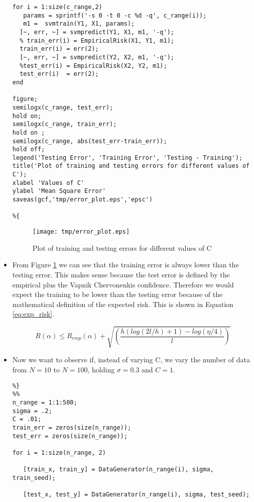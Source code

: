 \documentclass[11pt, twoside]{article}   	%
\begin{document}
\begin{itemize}
\begin{lstlisting}
for i = 1:size(c_range,2)
   params = sprintf('-s 0 -t 0 -c %d -q', c_range(i)); 
   m1 =  svmtrain(Y1, X1, params);
  [~, err, ~] = svmpredict(Y1, X1, m1, '-q'); 
  % train_err(i) = EmpiricalRisk(X1, Y1, m1); 
  train_err(i) = err(2); 
  [~, err, ~] = svmpredict(Y2, X2, m1, '-q');
  %test_err(i) = EmpiricalRisk(X2, Y2, m1); 
  test_err(i)  = err(2); 
end

figure; 
semilogx(c_range, test_err);
hold on; 
semilogx(c_range, train_err); 
hold on ;
semilogx(c_range, abs(test_err-train_err)); 
hold off; 
legend('Testing Error', 'Training Error', 'Testing - Training'); 
title('Plot of training and testing errors for different values of C'); 
xlabel 'Values of C'
ylabel 'Mean Square Error'
saveas(gcf,'tmp/error_plot.eps','epsc')

%{
\end{lstlisting}

\begin{figure}[h]
\centering
\texttt{[image: tmp/error\_plot.eps]}
\caption{Plot of training and testing errors for different values of C}
\label{fig:c_errors} 
\end{figure}

\item From Figure \ref{fig:c_errors} we can see that the training error is
always lower than the testing error. This makes sense because the test error
is defined by the empirical plus the Vapnik Chervonenkis confidence. Therefore we
would expect the training to be lower than the testing error because of the mathematical 
definition of the expected risk. This is shown in Equation \ref{eq:exp_risk}. 

\begin{equation}
R(\alpha) \leq R_{emp}(\alpha) + \sqrt{(\frac{h(log(2l/h)+1) -log(\eta/4)}{l})}
\label{eq:exp_risk}
\end{equation}

\item Now we want to observe if, instead of varying C, we vary the number
of data from $N=10$ to $N=100$, holding $\sigma = 0.3$ and $C=1$.

\begin{lstlisting}
%}
%%
n_range = 1:1:500; 
sigma = .2; 
C = .01; 
train_err = zeros(size(n_range)); 
test_err = zeros(size(n_range)); 

for i = 1:size(n_range, 2)
   
   [train_x, train_y] = DataGenerator(n_range(i), sigma, train_seed);

   [test_x, test_y] = DataGenerator(n_range(i), sigma, test_seed);
   

\end{lstlisting}
\end{itemize}
\end{document}
